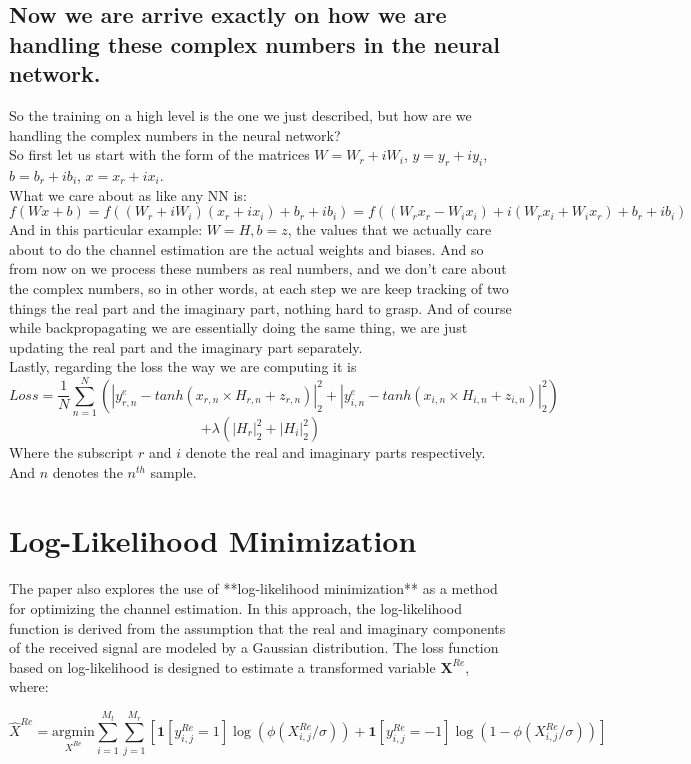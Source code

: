\documentclass{article}
\begin{document}
\subsection*{Now we are arrive exactly on how we are handling these complex numbers in the neural network.}
So the training on a high level is the one we just described, but how are we handling the complex numbers in the neural network? \\
So first let us start with the form of the matrices $W = W_r + iW_i$, $y = y_r +iy_i$, $b= b_r+ib_i$, $x = x_r +ix_i$. \\
What we care about as like any NN is: 
\[
f(Wx+b) = f((W_r + iW_i)(x_r + ix_i) + b_r + ib_i) = f((W_r x_r - W_i x_i) + i(W_r x_i + W_i x_r) + b_r + ib_i)
\]
And in this particular example: $W=H, b=z$, the values that we actually care about to do the channel estimation are the actual weights and biases. And so from now on we process these numbers as real numbers, and we don't care about the complex numbers, so in other words, at each step we are keep tracking of two things the real part and the imaginary part, nothing hard to grasp. And of course while backpropagating we are essentially doing the same thing, we are just updating the real part and the imaginary part separately. \\ 
Lastly, regarding the loss the way we are computing it is 
\[
Loss = \frac{1}{N} \sum_{n=1}^{N} (|y_{r,n}^e - tanh(x_{r,n} \times H_{r,n} + z_{r,n})|_2^2 + |y_{i,n}^e - tanh(x_{i,n} \times H_{i,n} + z_{i,n})|_2^2 ) 
\]
\[
  + \lambda (|H_r|_2^2 + |H_i|_2^2)
\]
Where the subscript $r$ and $i$ denote the real and imaginary parts respectively. And $n$ denotes the $n^{th}$ sample. \\


\section{Log-Likelihood Minimization}

The paper also explores the use of **log-likelihood minimization** as a method for optimizing the channel estimation. In this approach, the log-likelihood function is derived from the assumption that the real and imaginary components of the received signal are modeled by a Gaussian distribution. The loss function based on log-likelihood is designed to estimate a transformed variable \( \mathbf{X}^{Re} \), where:

\[
\hat{X}^{Re} = \underset{X^{Re}}{\text{argmin}} \sum_{i=1}^{M_t} \sum_{j=1}^{M_r} \left[ \mathbf{1}[y_{i,j}^{Re} = 1] \log(\phi(X_{i,j}^{Re}/\sigma)) + \mathbf{1}[y_{i,j}^{Re} = -1] \log(1 - \phi(X_{i,j}^{Re}/\sigma)) \right]
\]
\end{document}
